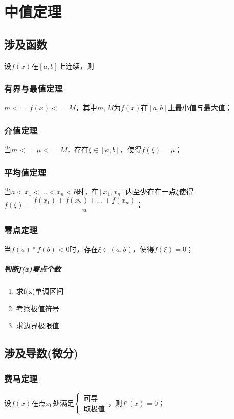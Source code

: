 
\chapter{中值定理}

\section{涉及函数}
设\(f(x)\)在\([a, b]\)上连续，则

\subsection{有界与最值定理}
\(m <= f(x) <= M\)，其中\(m, M\)为\(f(x)\)在\([a, b]\)上最小值与最大值；

\subsection{介值定理}
当\(m <= \mu <= M\)，存在\(\xi \in [a, b]\)，使得\(f(\xi) = \mu\)；

\subsection{平均值定理}
当\(a < x_1 < ... < x_n < b\)时，在\([x_1, x_n]\)内至少存在一点\(\xi\)使得\(f(\xi) = \dfrac{f(x_1) + f(x_2) + ... + f(x_n)}{n}\)；

\subsection{零点定理}
当\(f(a) * f(b) < 0\)时，存在\(\xi \in (a, b)\)，使得\(f(\xi) = 0\)；

\paragraph{判断f(x)零点个数}
\begin{enumerate}
    \item 求f(x)单调区间
    \item 考察极值符号
    \item 求边界极限值
\end{enumerate}


\section{涉及导数(微分)}

\subsection{费马定理}
设\(f(x)\)在点\(x_0\)处满足\(\begin{cases}
\text{可导} \\ 
\text{取极值}
\end{cases}\)，则\(f'(x) = 0\)；


